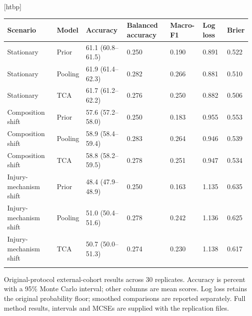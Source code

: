 [htbp]
\centering\footnotesize\setlength{\tabcolsep}{3pt}
\begin{tabularx}{\textwidth}{p{2.3cm}lYYYYY}\toprule
Scenario & Model & Accuracy & Balanced accuracy & Macro-F1 & Log loss & Brier \\\midrule
Stationary & Prior & 61.1 (60.8--61.5) & 0.250 & 0.190 & 0.891 & 0.522 \\
Stationary & Pooling & 61.9 (61.4--62.3) & 0.282 & 0.266 & 0.881 & 0.510 \\
Stationary & TCA & 61.7 (61.2--62.2) & 0.276 & 0.250 & 0.882 & 0.506 \\
\addlinespace
Composition shift & Prior & 57.6 (57.2--58.0) & 0.250 & 0.183 & 0.955 & 0.553 \\
Composition shift & Pooling & 58.9 (58.4--59.4) & 0.283 & 0.264 & 0.946 & 0.539 \\
Composition shift & TCA & 58.8 (58.2--59.5) & 0.278 & 0.251 & 0.947 & 0.534 \\
\addlinespace
Injury-mechanism shift & Prior & 48.4 (47.9--48.9) & 0.250 & 0.163 & 1.135 & 0.635 \\
Injury-mechanism shift & Pooling & 51.0 (50.4--51.6) & 0.278 & 0.242 & 1.136 & 0.625 \\
Injury-mechanism shift & TCA & 50.7 (50.0--51.3) & 0.274 & 0.230 & 1.138 & 0.617 \\
\addlinespace
\bottomrule\end{tabularx}
\caption{Original-protocol external-cohort results across 30 replicates. Accuracy is percent with a 95\% Monte Carlo interval; other columns are mean scores. Log loss retains the original probability floor; smoothed comparisons are reported separately. Full method results, intervals and MCSEs are supplied with the replication files.}